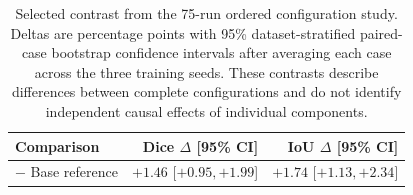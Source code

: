 \begin{table}[htbp]
\centering
\caption{Selected contrast from the 75-run ordered configuration
study. Deltas are percentage points with 95\% dataset-stratified paired-case
bootstrap confidence intervals after averaging each case across the three
training seeds. These contrasts describe differences between complete
configurations and do not identify independent causal effects of individual
components.}
\label{tab:attribution_controls}
\scriptsize
\setlength{\tabcolsep}{3.5pt}
\begin{tabular}{@{}lrr@{}}
\toprule
Comparison & Dice $\Delta$ [95\% CI] & IoU $\Delta$ [95\% CI] \\
\midrule
\methodname{} $-$ Base reference & $+1.46$ [$+0.95,+1.99$] & $+1.74$ [$+1.13,+2.34$] \\
\bottomrule
\end{tabular}
\end{table}
